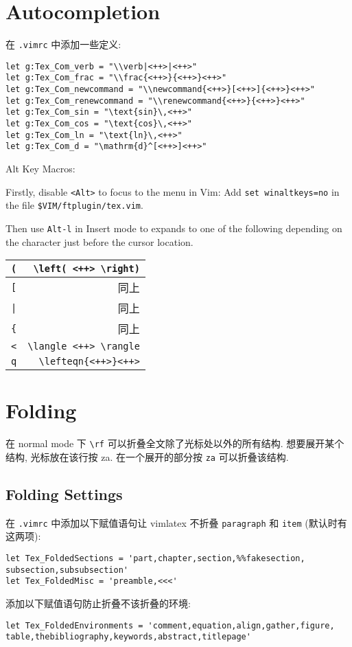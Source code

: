 \documentclass{article}
\begin{document}
\section{Autocompletion}
在 \verb|.vimrc| 中添加一些定义:
\begin{verbatim}
let g:Tex_Com_verb = "\\verb|<++>|<++>"
let g:Tex_Com_frac = "\\frac{<++>}{<++>}<++>" 
let g:Tex_Com_newcommand = "\\newcommand{<++>}[<++>]{<++>}<++>"
let g:Tex_Com_renewcommand = "\\renewcommand{<++>}{<++>}<++>"
let g:Tex_Com_sin = "\text{sin}\,<++>"
let g:Tex_Com_cos = "\text{cos}\,<++>"
let g:Tex_Com_ln = "\text{ln}\,<++>"
let g:Tex_Com_d = "\mathrm{d}^[<++>]<++>"
\end{verbatim}

Alt Key Macros:

Firstly, disable \verb|<Alt>| to focus to the menu in Vim: Add \verb|set winaltkeys=no| in the file \verb|$VIM/ftplugin/tex.vim|. 

Then use \verb|Alt-l| in Insert mode to expands to one of the following depending on the character just before the cursor location.
\begin{tabular}[h]{lr}
  \hline
  \verb|(| & \verb|\left( <++> \right)| \\
  \hline
  \verb|[| & 同上 \\
  \hline
  \verb`|` & 同上 \\
  \hline 
  \verb|{| & 同上 \\
  \hline
  \verb|<| & \verb|\langle <++> \rangle| \\
  \hline
  \verb|q| & \verb|\lefteqn{<++>}<++>| \\
  \hline
\end{tabular}
\section{Folding}
在 normal mode 下 \verb|\rf| 可以折叠全文除了光标处以外的所有结构. 想要展开某个结构, 光标放在该行按 za. 在一个展开的部分按 \verb|za| 可以折叠该结构.
\subsection*{Folding Settings}
在 \verb|.vimrc| 中添加以下赋值语句让 vimlatex 不折叠 \verb|paragraph| 和 \verb|item| (默认时有这两项):
\begin{verbatim}
let Tex_FoldedSections = 'part,chapter,section,%%fakesection,
subsection,subsubsection'
let Tex_FoldedMisc = 'preamble,<<<'
\end{verbatim}
添加以下赋值语句防止折叠不该折叠的环境:
\begin{verbatim}
let Tex_FoldedEnvironments = 'comment,equation,align,gather,figure,
table,thebibliography,keywords,abstract,titlepage'
\end{verbatim}
\end{document}
